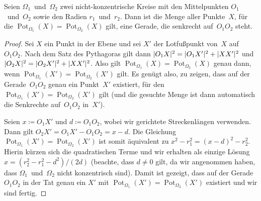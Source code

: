 \begin{satzmitnamen}
	Seien $\Omega_1$~und~$\Omega_2$ zwei nicht-konzentrische Kreise mit den  Mittelpunkten $O_1$~und~$O_2$ sowie den Radien $r_1$~und~$r_2$. Dann ist die Menge aller Punkte~$X$, für die $\operatorname{Pot}_{\Omega_1}(X)=\operatorname{Pot}_{\Omega_2}(X)$ gilt, eine Gerade, die senkrecht auf~$O_1O_2$ steht.
\end{satzmitnamen}

\begin{proof}
	Sei $X$ ein Punkt in der Ebene und sei $X'$ der Lotfußpunkt von~$X$ auf~$O_1O_2$. Nach dem Satz des Pythagoras gilt dann $\lvert O_1X\rvert^2=\lvert O_1X'\rvert^2+\lvert XX'\rvert^2$ und $\lvert O_2X\rvert^2=\lvert O_2X'\rvert^2+\lvert XX'\rvert^2$. Also gilt $\operatorname{Pot}_{\Omega_1}(X)=\operatorname{Pot}_{\Omega_2}(X)$ genau dann, wenn $\operatorname{Pot}_{\Omega_1}(X')=\operatorname{Pot}_{\Omega_2}(X')$ gilt. Es genügt also, zu zeigen, dass auf der Gerade~$O_1O_2$ genau ein Punkt~$X'$ existiert, für den $\operatorname{Pot}_{\Omega_1}(X')=\operatorname{Pot}_{\Omega_2}(X')$ gilt (und die gesuchte Menge ist dann automatisch die Senkrechte auf~$O_1O_2$ in~$X'$).
	
	Seien $x\coloneqq O_1X'$ und $d\coloneqq O_1O_2$, wobei wir gerichtete Streckenlängen verwenden. Dann gilt $O_2X'=O_1X'-O_1O_2=x-d$. Die Gleichung $\operatorname{Pot}_{\Omega_1}(X')=\operatorname{Pot}_{\Omega_2}(X')$ ist somit äquivalent zu $x^2-r_1^2=(x-d)^2-r_2^2$. Hierin kürzen sich die quadratischen Terme und wir erhalten als einzige Lösung $x={(r_2^2-r_1^2-d^2)}/{(2d)}$ (beachte, dass $d\neq 0$ gilt, da wir angenommen haben, dass $\Omega_1$~und~$\Omega_2$ nicht konzentrisch sind). Damit ist gezeigt, dass auf der Gerade $O_1O_2$ in der Tat genau ein $X'$ mit $\operatorname{Pot}_{\Omega_1}(X')=\operatorname{Pot}_{\Omega_2}(X')$ existiert und wir sind fertig.
\end{proof}

